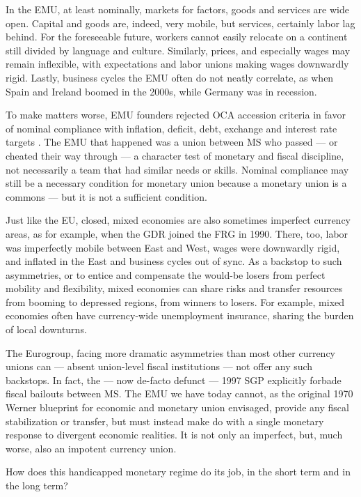 \documentclass[11pt,a4paper,oneside,openright]{article}
\begin{document}
In the \gls{EMU}, at least nominally, markets for factors, goods and services are wide open. 
Capital and goods are, indeed, very mobile, but services, certainly labor lag behind. 
For the foreseeable future, workers cannot easily relocate on a continent still divided by language and culture. 
Similarly, prices, and especially wages may remain inflexible, with expectations and labor unions making wages downwardly rigid. 
Lastly, business cycles the \gls{EMU} often do not neatly correlate, as when Spain and Ireland boomed in the 2000s, while Germany was in recession.

To make matters worse, \gls{EMU} founders rejected \gls{OCA} accession criteria in favor of nominal compliance with inflation, deficit, debt, exchange and interest rate targets \citep[4]{Begg2008}. 
The \gls{EMU} that happened was a union between \gls{MS} who passed --- or cheated their way through --- a character test of monetary and fiscal discipline, not necessarily a team that had similar needs or skills. 
Nominal compliance may still be a necessary condition for monetary union because a monetary union is a commons --- but it is not a sufficient condition.

Just like the \gls{EU}, closed, mixed economies are also sometimes imperfect currency areas, as for example, when the \gls{GDR} joined the \gls{FRG} in 1990. 
There, too, labor was imperfectly mobile between East and West, wages were downwardly rigid, and inflated in the East and business cycles out of sync. 
As a backstop to such asymmetries, or to entice and compensate the would-be losers from perfect mobility and flexibility, mixed economies can share risks and transfer resources from booming to depressed regions, from winners to losers. 
For example, mixed economies often have currency-wide unemployment insurance, sharing the burden of local downturns.

The Eurogroup, facing more dramatic asymmetries than most other currency unions can --- absent union-level fiscal institutions --- not offer any such backstops. 
In fact, the --- now de-facto defunct --- 1997 \gls{SGP} explicitly forbade fiscal bailouts between \gls{MS}. 
The \gls{EMU} we have today cannot, as the original 1970 Werner blueprint for economic and monetary union envisaged, provide any fiscal stabilization or transfer, but must instead make do with a single monetary response to divergent economic realities. 
It is not only an imperfect, but, much worse, also an impotent currency union.

How does this handicapped monetary regime do its job, in the short term and in the long term?
			
\end{document}
